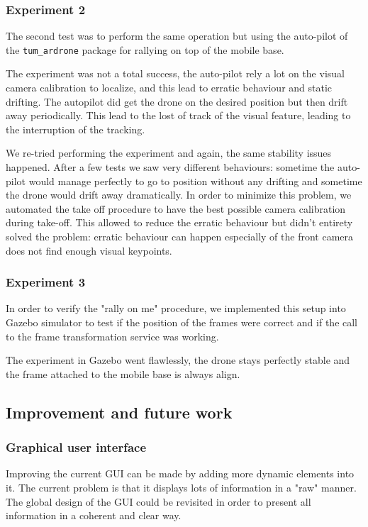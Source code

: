 \documentclass[11pt,a4paper]{article}
\begin{document}
\subsubsection{Experiment 2}
The second test was to perform the same operation but using the auto-pilot of the \verb!tum_ardrone!
package for rallying on top of the mobile base.

The experiment was not a total success, the auto-pilot rely a lot on the visual camera calibration to 
localize, and this lead to erratic behaviour and static drifting.
The autopilot did get the drone on the desired position but then drift away periodically. This lead to the 
lost of track of the visual feature, leading to the interruption of the tracking.

We re-tried performing the experiment and again, the same stability issues happened. After a few tests we 
saw very different behaviours: sometime the auto-pilot would manage perfectly to go to position without any
drifting and sometime the drone would drift away dramatically. In order to minimize this problem, we 
automated the take off procedure to have the best possible camera calibration during take-off. This 
allowed to reduce the erratic behaviour but didn't entirety solved the problem: erratic behaviour can happen
especially of the front camera does not find enough visual keypoints.

\subsubsection{Experiment 3}
In order to verify the "rally on me" procedure, we implemented this setup into Gazebo simulator to test if
the position of the frames were correct and if the call to the frame transformation service was working.

The experiment in Gazebo went flawlessly, the drone stays perfectly stable and the frame attached to the 
mobile base is always align.

\subsection{Improvement and future work}
\subsubsection{Graphical user interface}
Improving the current GUI can be made by adding more dynamic elements into it. The current 
problem is
that it displays lots of information in a "raw" manner. The global design of the GUI could be 
revisited in
order to present all information  in a coherent and clear way.
\end{document}
